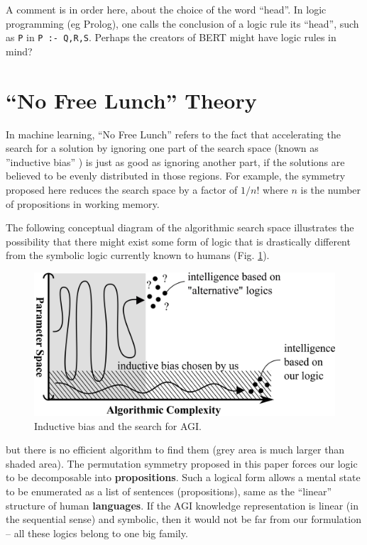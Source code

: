 \documentclass[orivec]{llncs}
\begin{document}
A comment is in order here, about the choice of the word ``head''.  In logic programming (eg Prolog), one calls the conclusion of a logic rule its ``head'', such as \texttt{P} in \texttt{P :- Q,R,S}.  Perhaps the creators of BERT might have logic rules in mind?

\section{``No Free Lunch'' Theory}
\label{sec:no-free-lunch}

In machine learning, ``No Free Lunch'' \cite{Wolpert1997} \cite{Alpaydin2020} refers to the fact that accelerating the search for a solution by ignoring one part of the search space (known as ''inductive bias'' \cite{Alpaydin2020}) is just as good as ignoring another part, if the solutions are believed to be evenly distributed in those regions.  For example, the symmetry proposed here reduces the search space by a factor of $1/n!$ where $n$ is the number of propositions in working memory.

The following conceptual diagram of the algorithmic search space illustrates the possibility that there might exist some form of logic that is drastically different from the symbolic logic currently known to humans (Fig. \ref{fig:inductive-bias}).

\begin{figure}[h]
\centering
\includegraphics[scale=0.45]{no-free-lunch.png}
\caption{Inductive bias and the search for AGI.}
\label{fig:inductive-bias}
\end{figure}

but there is no efficient algorithm to find them (grey area is much larger than shaded area).  The permutation symmetry proposed in this paper forces our logic to be decomposable into \textbf{propositions}.  Such a logical form allows a mental state to be enumerated as a list of sentences (propositions), same as the ``linear'' structure of human \textbf{languages}.  If the AGI knowledge representation is linear (in the sequential sense) and symbolic, then it would not be far from our formulation -- all these logics belong to one big family.
\end{document}
